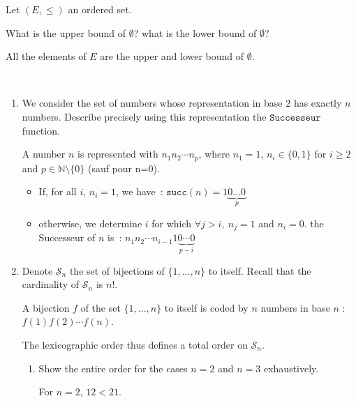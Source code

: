 \documentclass[a4paper,11pt]{exam}
\newcommand{\N}{\mathbb{N}}
\renewcommand{\S}{\mathcal{S}}
\begin{document}
\begin{questions}
  \question
  Let $(E,\leq)$ an ordered set.

  What is the upper bound of $\emptyset$?
  what is the lower bound of $\emptyset$? 

  \begin{solution}
    All the elements of $E$ are the upper and lower bound of $ \emptyset $.
  \end{solution}

  \question
  ~\vspace{-0.6cm}
  \begin{enumerate}
    \item We consider the set of numbers whose representation in base $2$ has exactly $n$ numbers. Describe precisely using this representation the $\texttt{Successeur}$ function.

      \begin{solution}
        \renewcommand{\succ}{\texttt{succ}}
        A number $n$ is represented with $n_1 n_2 \cdots n_p$, where $n_1=1$, $n_i \in
        \{0,1\}$ for $i \geq 2$ and $p \in \N \setminus \{0\}$ (sauf pour n=0).
        \begin{itemize}
          \item If, for all $i$, $n_i=1$,  we have~:
            $\succ(n) = 1 \underbrace{0 \dots 0}_{p}$
          \item otherwise, we determine $i$ for which $\forall j>i,~n_j=1$ and
            $n_i=0$.
            the Successeur of $n$ is~:
            $n_1 n_2 \cdots n_{i-1} 1 \underbrace{0 \cdots 0}_{p-i}$
        \end{itemize}
      \end{solution}

    

    \item Denote $\S_n$ the set of bijections of $\{1,...,n\}$
      to itself. Recall that the cardinality of $\S_n$ is $n!$.

      A bijection $f$ of the set $\{1,...,n\}$ to itself is coded by  $n$ numbers in base $n$ : $f(1)f(2)\cdots f(n)$.

      The lexicographic order thus defines a total order on $\S_n$.

      \begin{enumerate}
        \item Show the entire order for the cases $n=2$ and $n=3$ exhaustively.

          \begin{solution}
           For $n = 2$, $12 < 21$. 


\end{solution}
\end{enumerate}
\end{enumerate}
\end{questions}
\end{document}
